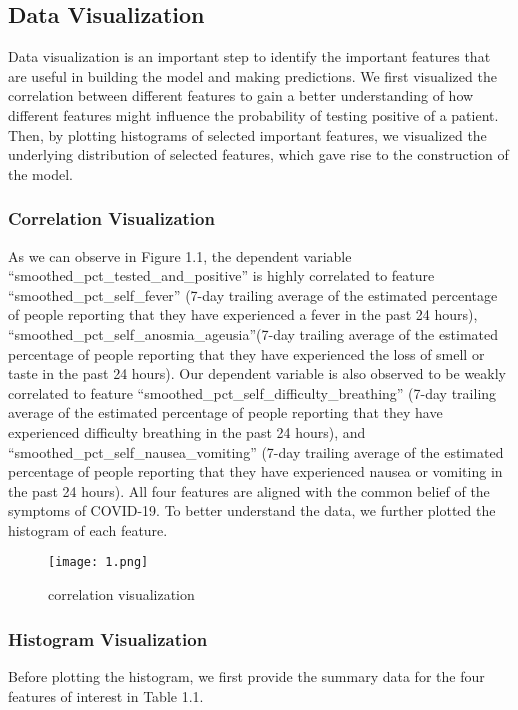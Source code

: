 \documentclass[10pt, a4paper, twocolumn]{article} %
\begin{document}
\subsection{Data Visualization}
Data visualization is an important step to identify the important features that are useful in building the model and making predictions. We first visualized the correlation between different features to gain a better understanding of how different features might influence the probability of testing positive of a patient. Then, by plotting histograms of selected important features, we visualized the underlying distribution of selected features, which gave rise to the construction of the model. 

\subsubsection{Correlation Visualization}
As we can observe in Figure 1.1, the dependent variable “smoothed\_pct\_tested\_and\_positive” is highly correlated to feature “smoothed\_pct\_self\_fever” (7-day trailing average of the estimated percentage of people reporting that they have experienced a fever in the past 24 hours), “smoothed\_pct\_self\_anosmia\_ageusia”(7-day trailing average of the estimated percentage of people reporting that they have experienced the loss of smell or taste in the past 24 hours). Our dependent variable is also observed to be weakly correlated to feature “smoothed\_pct\_self\_difficulty\_breathing” (7-day trailing average of the estimated percentage of people reporting that they have experienced difficulty breathing in the past 24 hours), and “smoothed\_pct\_self\_nausea\_vomiting” (7-day trailing average of the estimated percentage of people reporting that they have experienced nausea or vomiting in the past 24 hours). All four features are aligned with the common belief of the symptoms of COVID-19. To better understand the data, we further plotted the histogram of each feature.

\begin{figure}
	\texttt{[image: 1.png]} %
	\caption{correlation visualization} %
\end{figure}

\subsubsection{Histogram Visualization}
Before plotting the histogram, we first provide the summary data for the four features of interest in Table 1.1.
\end{document}
